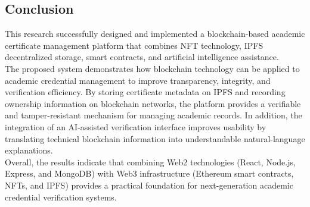 \subsection{Conclusion}

    This research successfully designed and implemented a blockchain-based academic certificate management platform that combines NFT technology, IPFS decentralized storage, smart contracts, and artificial intelligence assistance.\\

    The proposed system demonstrates how blockchain technology can be applied to academic credential management to improve transparency, integrity, and verification efficiency. By storing certificate metadata on IPFS and recording ownership information on blockchain networks, the platform provides a verifiable and tamper-resistant mechanism for managing academic records. In addition, the integration of an AI-assisted verification interface improves usability by translating technical blockchain information into understandable natural-language explanations.\\
    
    Overall, the results indicate that combining Web2 technologies (React, Node.js, Express, and MongoDB) with Web3 infrastructure (Ethereum smart contracts, NFTs, and IPFS) provides a practical foundation for next-generation academic credential verification systems.
